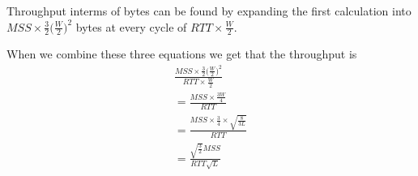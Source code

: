 \documentclass{article}
\begin{document}
Throughput interms of bytes can be found by expanding the first calculation into  $MSS \times \frac{3}{2}\bigg(\frac{W}{2}\bigg)^2$ bytes at every cycle of $RTT \times \frac{W}{2}$. 

When we combine these three equations we get that the throughput is 
\begin{gather*}
\frac{MSS \times \frac{3}{2}\bigg(\frac{W}{2}\bigg)^2}{RTT \times \frac{W}{2}}\\
=\frac{MSS \times \frac{3W}{4}}{RTT}\\
=\frac{MSS \times \frac{3}{4}\times \sqrt{\frac{8}{3L}}}{RTT}\\
=\frac{\sqrt{\frac{3}{2}} MSS}{RTT\sqrt{L}}\\
\end{gather*}



\end{document}

